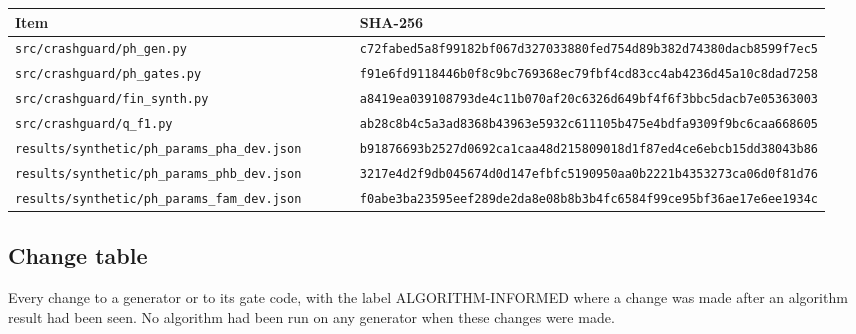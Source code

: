 {\scriptsize\raggedright
\begin{longtable}{p{0.475\linewidth}p{0.475\linewidth}}
\toprule
Item & SHA-256 \\
\midrule
\endhead
\texttt{src/crashguard/ph\_gen.py} & \texttt{c72fabed5a8f99182bf067d327033880fed754d89b382d74380dacb8599f7ec5} \\
\texttt{src/crashguard/ph\_gates.py} & \texttt{f91e6fd9118446b0f8c9bc769368ec79fbf4cd83cc4ab4236d45a10c8dad7258} \\
\texttt{src/crashguard/fin\_synth.py} & \texttt{a8419ea039108793de4c11b070af20c6326d649bf4f6f3bbc5dacb7e05363003} \\
\texttt{src/crashguard/q\_f1.py} & \texttt{ab28c8b4c5a3ad8368b43963e5932c611105b475e4bdfa9309f9bc6caa668605} \\
\texttt{results/synthetic/ph\_params\_pha\_dev.json} & \texttt{b91876693b2527d0692ca1caa48d215809018d1f87ed4ce6ebcb15dd38043b86} \\
\texttt{results/synthetic/ph\_params\_phb\_dev.json} & \texttt{3217e4d2f9db045674d0d147efbfc5190950aa0b2221b4353273ca06d0f81d76} \\
\texttt{results/synthetic/ph\_params\_fam\_dev.json} & \texttt{f0abe3ba23595eef289de2da8e08b8b3b4fc6584f99ce95bf36ae17e6ee1934c} \\
\bottomrule
\end{longtable}}

\subsection*{Change table}

Every change to a generator or to its gate code, with the label ALGORITHM-INFORMED where a change was made after an algorithm result had been seen. No algorithm had been run on any generator when these changes were made.

